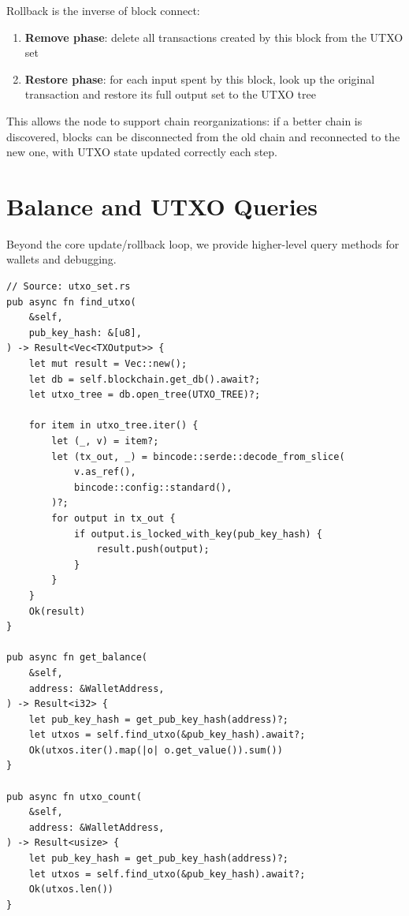 \begin{notebox}
Rollback is the inverse of block connect:
\begin{enumerate}
  \item \textbf{Remove phase}: delete all transactions created by this block from the UTXO set
  \item \textbf{Restore phase}: for each input spent by this block, look up the original transaction and restore its full output set to the UTXO tree
\end{enumerate}

This allows the node to support chain reorganizations: if a better chain is discovered, blocks can be disconnected from the old chain and reconnected to the new one, with UTXO state updated correctly each step.
\end{notebox}

\section{Balance and UTXO Queries}
\label{sec:ch09-4-queries}

Beyond the core update/rollback loop, we provide higher-level query methods for wallets and debugging.

\begin{listing}[htbp]
\caption{Find UTXOs and compute balance}
\label{lst:ch09-4-8}
\begin{verbatim}
// Source: utxo_set.rs
pub async fn find_utxo(
    &self,
    pub_key_hash: &[u8],
) -> Result<Vec<TXOutput>> {
    let mut result = Vec::new();
    let db = self.blockchain.get_db().await?;
    let utxo_tree = db.open_tree(UTXO_TREE)?;

    for item in utxo_tree.iter() {
        let (_, v) = item?;
        let (tx_out, _) = bincode::serde::decode_from_slice(
            v.as_ref(),
            bincode::config::standard(),
        )?;
        for output in tx_out {
            if output.is_locked_with_key(pub_key_hash) {
                result.push(output);
            }
        }
    }
    Ok(result)
}

pub async fn get_balance(
    &self,
    address: &WalletAddress,
) -> Result<i32> {
    let pub_key_hash = get_pub_key_hash(address)?;
    let utxos = self.find_utxo(&pub_key_hash).await?;
    Ok(utxos.iter().map(|o| o.get_value()).sum())
}

pub async fn utxo_count(
    &self,
    address: &WalletAddress,
) -> Result<usize> {
    let pub_key_hash = get_pub_key_hash(address)?;
    let utxos = self.find_utxo(&pub_key_hash).await?;
    Ok(utxos.len())
}
\end{verbatim}
\end{listing}

